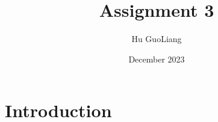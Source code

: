 \documentclass{article}
\title{Assignment 3}
\author{Hu GuoLiang}
\date{December 2023}
\begin{document}
\maketitle

\section{Introduction}
\end{document}
